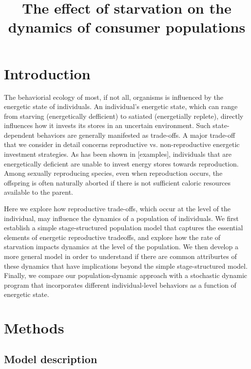 \documentclass[11pt]{article}
\begin{document}
\title{The effect of starvation on the dynamics of consumer populations}
\maketitle


\section{Introduction}

The behaviorial ecology of most, if not all, organisms is influenced by the energetic state of individuals.
An individual's energetic state, which can range from starving (energetically defficient) to satiated (energetially replete), directly influences how it invests its stores in an uncertain environment.
Such state-dependent behaviors are generally manifested as trade-offs.
A major trade-off that we consider in detail concerns reproductive vs. non-reproductive energetic investment strategies.
As has been shown in [examples], individuals that are energetically deficient are unable to invest energy stores towards reproduction.
Among sexually reproducing species, even when reproduction occurs, the offspring is often naturally aborted if there is not sufficient caloric resources available to the parent.

Here we explore how reproductive trade-offs, which occur at the level of the individual, may influence the dynamics of a population of individuals.
We first establish a simple stage-structured population model that captures the essential elements of energetic reproductive tradeoffs, and explore how the rate of starvation impacts dynamics at the level of the population.
We then develop a more general model in order to understand if there are common attriburtes of these dynamics that have implications beyond the simple stage-structured model.
Finally, we compare our population-dynamic approach with a stochastic dynamic program that incorporates different individual-level behaviors as a function of energetic state.



\section{Methods}
\subsection{Model description}
\end{document}
